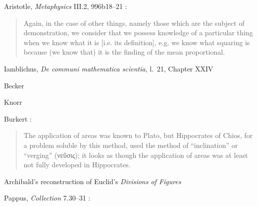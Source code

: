 \documentclass{article}
\begin{document}
Aristotle, {\em Metaphysics} III.2, 996b18--21 \cite[pp.~191--192]{aristotle}:

\begin{quote}
Again, in the case of other things, namely those which are the
subject of demonstration, we consider that we possess knowledge
of a particular thing when we know what it is [i.e. its definition],
e.g. we know what squaring is because (we know that) it is the
finding of the mean proportional.
\end{quote}

Iamblichus, {\em De communi mathematica scientia}, l.~21, Chapter XXIV \cite[p.~75]{festa}




Becker \cite[p.~59f.]{becker}

Knorr \cite{knorr}

Burkert \cite[p.~452]{burkert}:

\begin{quote}
The application of areas was known to Plato, but Hippocrates of Chios, for a problem soluble
by this method, used the method of ``inclination'' or ``verging'' (νεῦσις); it looks as though
the application of areas was at least not fully developed in Hippocrates.
\end{quote}

Archibald's reconstruction of Euclid's {\em Divisions of Figures} \cite{divisions}

Pappus, {\em Collection} 7.30--31 \cite[pp.~114--116]{pappus7a}:
\end{document}
